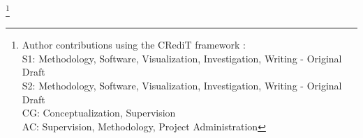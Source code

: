 \documentclass[sigconf]{acmart}
\begin{document}




\newcommand\blfootnote[1]{%
  \begingroup
  \renewcommand\thefootnote{}\footnote{#1}%
  \addtocounter{footnote}{-1}%
  \endgroup
}

\maketitle

\blfootnote{Author contributions using the CRediT framework \cite{brand2015beyond, devos2024few}:\\
S1: Methodology, Software, Visualization, Investigation, Writing -
Original Draft\\
S2: Methodology, Software, Visualization, Investigation, Writing -
Original Draft\\
CG: Conceptualization, Supervision\\
AC: Supervision, Methodology, Project Administration
}
\end{document}
